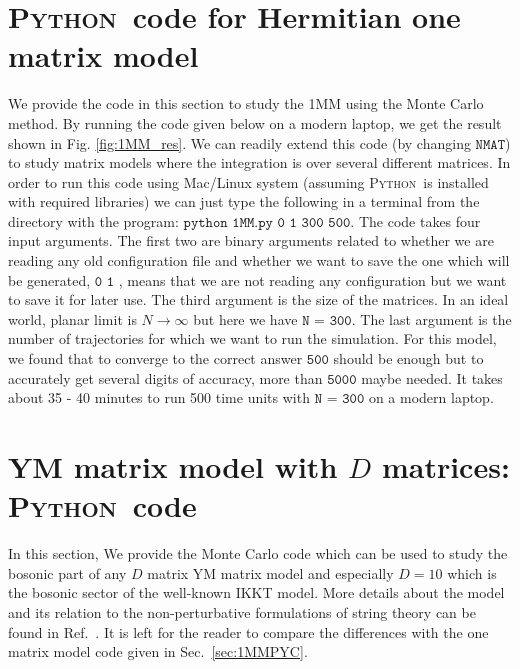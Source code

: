 \documentclass[letter,11pt]{article}
\newcommand{\PY}{\textsc{Python}}
\begin{document}
\section{\label{sec:1MMPYC}\PY~code for Hermitian one matrix model}
We provide the code in this section to study the 1MM using the Monte Carlo method. By running the code given below
on a modern laptop, we get the result shown in 
Fig. \ref{fig:1MM_res}. We can readily extend this code (by changing $\texttt{NMAT}$) to study matrix models where the integration is over several different matrices. 
In order to run this code using Mac/Linux system (assuming  \PY~is installed with required libraries) we can just type the following in a terminal from the directory with the program:
$\texttt{python 1MM.py 0 1 300 500}$. The code takes four input arguments. The first two are binary arguments
related to whether we are reading any old configuration file and whether we want to save the one which will be 
generated, $\texttt{0 1}$ , means that we are not reading any configuration but we want to save it for later use. The third argument is the size of the matrices. In an ideal world, planar limit is $ N \to \infty$ but here we have $\texttt{N = 300}$. The last argument is the 
number of trajectories for which we want to run the simulation. For this model, we found that to converge to the correct answer $\texttt{500}$ should be enough but to accurately 
get several digits of accuracy, more than $\texttt{5000}$ maybe needed. 
It takes about 35 - 40 minutes to run 500 time units 
with $\texttt{N = 300}$ on a modern laptop. 
\begin{mdframed}[backgroundcolor=mauve!3] 

\end{mdframed} 
\vspace{12mm}
\section{\label{sec:YMC}YM matrix model with $D$ matrices: \PY~code}

In this section, We provide the Monte Carlo code which can be used to study the bosonic part of any $D$ matrix YM matrix model and especially $D=10$ which is the bosonic sector of the well-known IKKT model. More details about the model and its relation to the non-perturbative formulations of string theory can be found in Ref.~\cite{Hotta:1998en}.
It is left for the reader to compare the differences with the one matrix model code given in Sec.~\ref{sec:1MMPYC}. 
	\begin{mdframed}[backgroundcolor=mauve!3] 
			
	\end{mdframed} 
\end{document}

